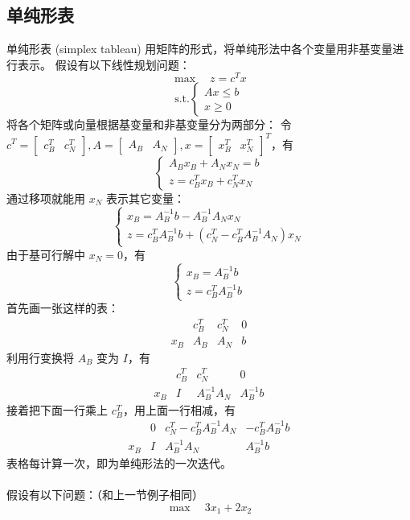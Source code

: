 \subsection{单纯形表}
单纯形表 (simplex tableau) 用矩阵的形式，将单纯形法中各个变量用非基变量进行表示。
假设有以下线性规划问题：
$$
\max \quad z = c^Tx
$$
$$
\text{s.t.} 
\begin{cases}
    Ax \le b \\
    x \ge 0
\end{cases}
$$
将各个矩阵或向量根据基变量和非基变量分为两部分：
令 $c^T = \begin{bmatrix} c_B^T & c_N^T \end{bmatrix}, A = \begin{bmatrix} A_B & A_N \end{bmatrix}, x = \begin{bmatrix} x_B^T & x_N^T \end{bmatrix}^T$，有
$$
\begin{cases}
A_Bx_B + A_Nx_N = b \\ 
z = c_B^Tx_B + c_N^Tx_N
\end{cases}
$$
通过移项就能用 $x_N$ 表示其它变量：
$$
\begin{cases}
x_B = A_B^{-1}b - A_B^{-1}A_Nx_N \\ 
z = c_B^TA_B^{-1}b + (c_N^T - c_B^TA_B^{-1}A_N)x_N
\end{cases}
$$
由于基可行解中 $x_N = 0$，有
$$
\begin{cases}
x_B = A_B^{-1}b \\ 
z = c_B^TA_B^{-1}b
\end{cases}
$$
首先画一张这样的表：
$$
\begin{array}{c|cc|c} & c_B^T & c_N^T & 0 \\ \hline x_B & A_B & A_N & b\end{array}
$$
利用行变换将 $A_B$ 变为 $I$，有
$$
\begin{array}{c|cc|c} & c_B^T & c_N^T & 0 \\ \hline x_B & I & A_B^{-1}A_N & A_B^{-1}b\end{array}
$$
接着把下面一行乘上 $c_B^T$，用上面一行相减，有
$$
\begin{array}{c|cc|c} & 0 & c_N^T-c_B^TA_B^{-1}A_N & -c_B^TA_B^{-1}b \\ \hline x_B & I & A_B^{-1}A_N & A_B^{-1}b\end{array}
$$
表格每计算一次，即为单纯形法的一次迭代。 \\~\\
假设有以下问题：（和上一节例子相同）
$$
\max \quad 3x_1 + 2x_2
$$
